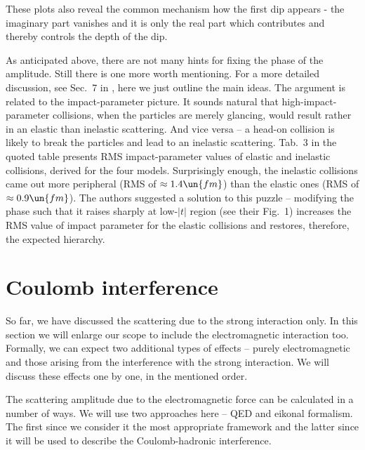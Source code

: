 These plots also reveal the common mechanism how the first dip appears - the imaginary part vanishes and it is only the real part which contributes and thereby controls the depth of the dip.



As anticipated above, there are not many hints for fixing the phase of the amplitude. Still there is one more worth mentioning. For a more detailed discussion, see Sec.~7 in , here we just outline the main ideas. The argument is related to the impact-parameter picture. It sounds natural that high-impact-parameter collisions, when the particles are merely glancing, would result rather in an elastic than inelastic scattering. And vice versa -- a head-on collision is likely to break the particles and lead to an inelastic scattering. Tab.~3 in the quoted table presents RMS impact-parameter values of elastic and inelastic collisions, derived for the four models. Surprisingly enough, the inelastic collisions came out more peripheral (RMS of $\approx 1.4\un{fm}$) than the elastic ones (RMS of $\approx 0.9\un{fm}$). The authors suggested a solution to this puzzle -- modifying the phase such that it raises sharply at low-$|t|$ region (see their Fig.~1) increases the RMS value of impact parameter for the elastic collisions and restores, therefore, the expected hierarchy.

\section[el coulomb]{Coulomb interference}

So far, we have discussed the scattering due to the strong interaction only. In this section we will enlarge our scope to include the electromagnetic interaction too. Formally, we can expect two additional types of effects -- purely electromagnetic and those arising from the interference with the strong interaction. We will discuss these effects one by one, in the mentioned order.

The scattering amplitude due to the electromagnetic force can be calculated in a number of ways. We will use two approaches here -- QED and eikonal formalism. The first since we consider it the most appropriate framework and the latter since it will be used to describe the Coulomb-hadronic interference.

